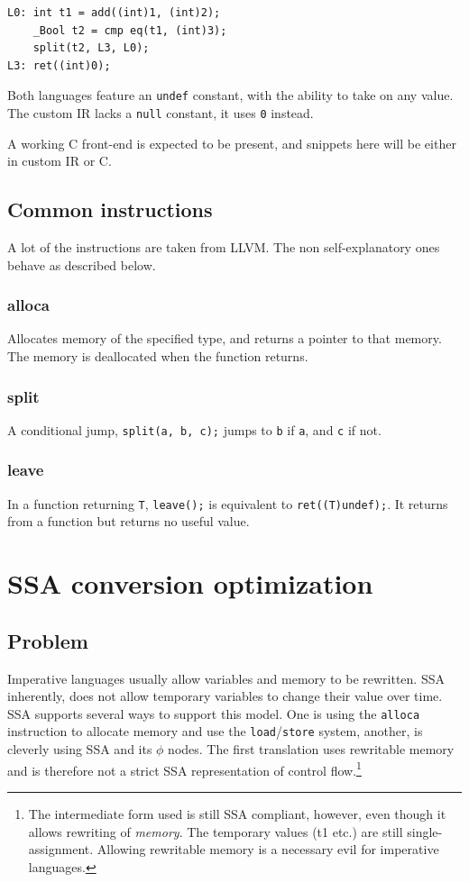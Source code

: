 \documentclass[12pt, a4paper]{article}
\begin{document}
\begin{lstlisting}
L0:	int t1 = add((int)1, (int)2);
	_Bool t2 = cmp eq(t1, (int)3);
	split(t2, L3, L0);
L3:	ret((int)0);
\end{lstlisting}

Both languages feature an \verb+undef+ constant, with the ability to take on any
value. The custom IR lacks a \verb+null+ constant, it uses \verb+0+ instead.

A working C front-end is expected to be present, and snippets here will be 
either in custom IR or C.

\subsection{Common instructions}
A lot of the instructions are taken from LLVM. The non self-explanatory ones
behave as described below.
\subsubsection{alloca}
Allocates memory of the specified type, and returns a pointer to that memory.
The memory is deallocated when the function returns.
\subsubsection{split}
A conditional jump, \verb+split(a, b, c);+ jumps to \verb+b+ if \verb+a+, and
\verb+c+ if not.
\subsubsection{leave}
In a function returning \verb+T+, \verb+leave();+ is equivalent to
\verb+ret((T)undef);+. It returns from a function but returns no useful value.

  \section{SSA conversion optimization}
  \label{sec:ssa}
  \subsection{Problem}
Imperative languages usually allow variables and memory to be rewritten. SSA 
inherently, does not allow temporary variables to change their value over time. 
SSA supports several ways to support this model. One is using the \verb+alloca+
instruction to allocate memory and use the \verb+load+/\verb+store+ system,
another, is cleverly using SSA and its $\phi$ nodes. The first translation uses
rewritable memory and is therefore not a strict SSA representation of control
flow.\footnote{The intermediate form used is still SSA compliant, however, even though it
allows rewriting of \textit{memory}. The temporary values (t1 etc.) are
still single-assignment. Allowing rewritable memory is a necessary evil for
imperative languages.}
\end{document}

